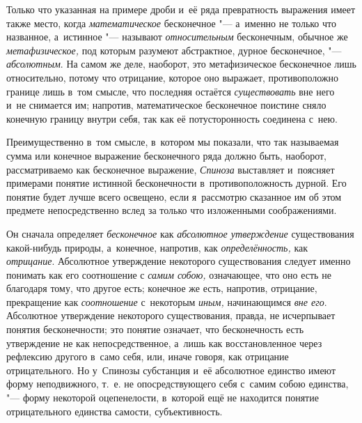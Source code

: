 Только что указанная на примере дроби и~её ряда превратность выражения имеет
также место, когда {\em математическое} бесконечное "--- а~именно не только что
названное, а~истинное "--- называют {\em относительным} бесконечным,
обычное же {\em метафизическое,} под которым разумеют абстрактное,
дурное бесконечное, "--- {\em абсолютным}. На самом же деле, наоборот, это
метафизическое бесконечное лишь относительно, потому что отрицание, которое оно
выражает, противоположно границе лишь в~том смысле, что последняя остаётся
{\em существовать} вне него и~не снимается им; напротив, математическое
бесконечное поистине сняло конечную границу внутри себя, так как её
потусторонность соединена с~нею.\label{bkm:bm52b}

Преимущественно в~том смысле, в~котором мы показали, что так называемая сумма
или конечное выражение бесконечного ряда должно быть, наоборот, рассматриваемо
как бесконечное выражение, {\em Спиноза} выставляет и~поясняет примерами
понятие истинной бесконечности в~противоположность дурной. Его понятие будет
лучше всего освещено, если я~рассмотрю сказанное им об этом предмете
непосредственно вслед за только что изложенными соображениями.

Он сначала определяет {\em бесконечное} как {\em абсолютное утверждение}
существования какой-нибудь природы, а~конечное, напротив, как
{\em определённость,} как {\em отрицание}. Абсолютное утверждение некоторого
существования следует именно понимать как его соотношение с {\em самим собою,}
означающее, что оно есть не благодаря тому, что другое есть; конечное же есть,
напротив, отрицание, прекращение как {\em соотношение} с~некоторым
{\em иным,} начинающимся {\em вне его}. Абсолютное утверждение некоторого
существования, правда, не исчерпывает понятия бесконечности; это понятие
означает, что бесконечность есть утверждение не как непосредственное, а~лишь
как восстановленное через рефлексию другого в~само себя, или, иначе говоря, как
отрицание отрицательного. Но у~Спинозы субстанция и~её абсолютное единство
имеют форму неподвижного, т.~е. не опосредствующего себя с~самим собою
единства, "--- форму некоторой оцепенелости, в~которой ещё не находится понятие
отрицательного единства самости, субъективность.


